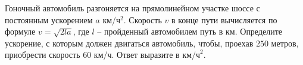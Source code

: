 \begin{ex}
	\begin{condition}
		Гоночный автомобиль разгоняется на прямолинейном участке шоссе с постоянным ускорением \( a \) км/ч\( ^2 \). Скорость \( v \)  в конце пути вычисляется по формуле \( v=\sqrt{2la} \), где \( l \) -- пройденный автомобилем путь в км. Определите ускорение, с которым должен двигаться автомобиль, чтобы, проехав \( 250 \) метров, приобрести скорость \( 60 \) км/ч. Ответ выразите в \( \text{км/ч}^2 \).
	\end{condition}
\end{ex}